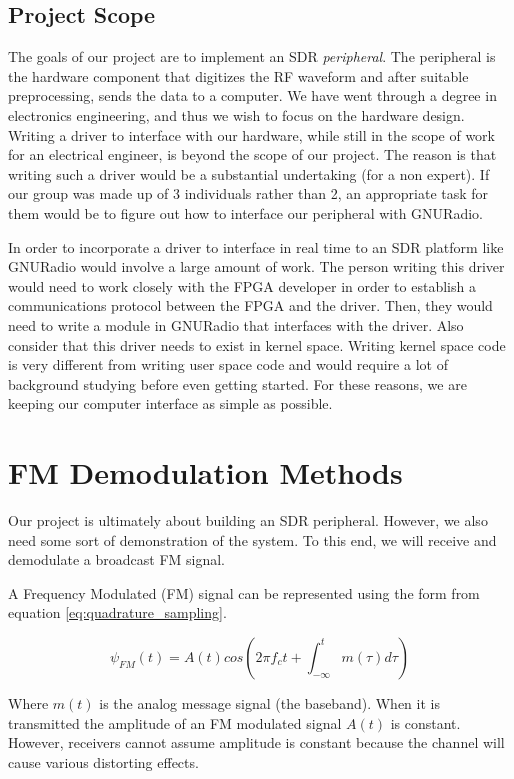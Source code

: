 \documentclass[a4paper, 12pt, notitlepage]{article}
\begin{document}
\subsection{Project Scope}
The goals of our project are to implement an SDR \textit{peripheral}.  The peripheral is the hardware component that digitizes the RF waveform and after suitable preprocessing, sends the data to a computer.  We have went through a degree in electronics engineering, and thus we wish to focus on the hardware design.  Writing a driver to interface with our hardware, while still in the scope of work for an electrical engineer, is beyond the scope of our project.  The reason is that writing such a driver would be a substantial undertaking (for a non expert).  If our group was made up of 3 individuals rather than 2, an appropriate task for them would be to figure out how to interface our peripheral with GNURadio.

In order to incorporate a driver to interface in real time to an SDR platform like GNURadio would involve a large amount of work.  The person writing this driver would need to work closely with the FPGA developer in order to establish a communications protocol between the FPGA and the driver.  Then, they would need to write a module in GNURadio that interfaces with the driver.  Also consider that this driver needs to exist in kernel space.  Writing kernel space code is very different from writing user space code and would require a lot of background studying before even getting started.  For these reasons, we are keeping our computer interface as simple as possible.

%
%

\section{FM Demodulation Methods}
Our project is ultimately about building an SDR peripheral.  However, we also need some sort of demonstration of the system.  To this end, we will receive and demodulate a broadcast FM signal.

A Frequency Modulated (FM) signal can be represented using the form from equation \ref{eq:quadrature_sampling}.

\begin{equation}
  \psi_{FM}(t) = A(t)cos(2\pi f_c t + \int_{-\infty}^{t}m(\tau)d\tau)
\end{equation}

Where $m(t)$ is the analog message signal (the baseband).  When it is transmitted the amplitude of an FM modulated signal $A(t)$ is constant.  However, receivers cannot assume amplitude is constant because the channel will cause various distorting effects.
\end{document}
